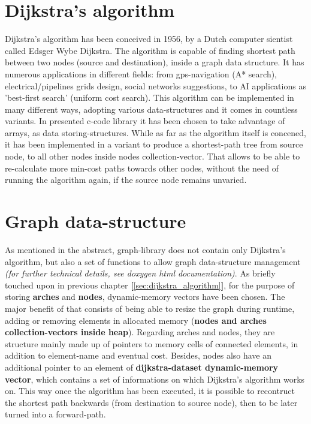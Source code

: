 \documentclass{article}                                                                                                     %
\begin{document}
\section{Dijkstra's algorithm}                                                                                              %
  Dijkstra's algorithm has been conceived in 1956, by a Dutch computer sientist called Edsger Wybe Dijkstra.                %
  The algorithm is capable of finding shortest path between two nodes (source and destination), inside a graph data
  structure. It has numerous applications in different fields: from gps-navigation (A* search), electrical/pipelines
  grids design, social networks suggestions, to AI applications as 'best-first search' (uniform cost search). This
  algorithm can be implemented in many different ways, adopting various data-structures and it comes in countless
  variants. In presented c-code library it has been chosen to take advantage of arrays, as data storing-structures.
  While as far as the algorithm itself is concened, it has been implemented in a variant to produce a shortest-path
  tree from source node, to all other nodes inside nodes collection-vector. That allows to be able to re-calculate
  more min-cost paths towards other nodes, without the need of running the algorithm again, if the source node remains
  unvaried.
\label{sec:dijkstra_algorithm}                                                                                              %

\section{Graph data-structure}                                                                                              %
  As mentioned in the abstract, graph-library does not contain only Dijkstra’s algorithm, but also a set of functions       %
  to allow graph data-structure management \textit{(for further technical details, see doxygen html documentation)}.
  As briefly touched upon in previous chapter \textbf{[}\ref{sec:dijkstra_algorithm}\textbf{]}, for the purpose of
  storing \textbf{arches} and \textbf{nodes}, dynamic-memory vectors have been chosen. The major benefit of that
  consists of being able to resize the graph during runtime, adding or removing elements in allocated memory 
  (\textbf{nodes and arches collection-vectors inside heap}). Regarding arches and nodes, they are structure mainly
  made up of pointers to memory cells of connected elements, in addition to element-name and eventual cost. Besides,
  nodes also have an additional pointer to an element of \textbf{dijkstra-dataset dynamic-memory vector}, which contains
  a set of informations on which Dijkstra's algorithm works on. This way once the algorithm has been executed, it is
  possible to recontruct the shortest path backwards (from destination to source node), then to be later turned into a
  forward-path.
\label{sec:graph_data_structure}                                                                                            %
\end{document}
